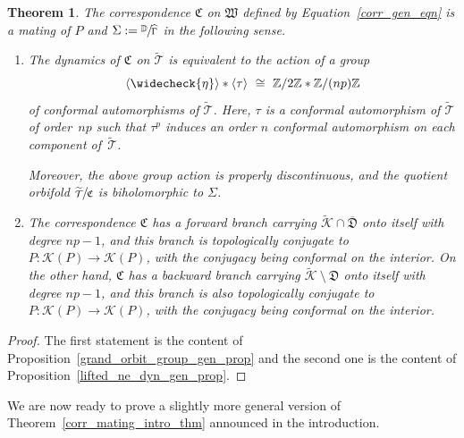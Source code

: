 \documentclass[JEP,XML,SOM,Unicode,NoFloatCountersInSection,published]{cedram}
\let\faktor\sfrac
\newtheorem{theorem}[lemma]{Theorem}
\theoremstyle{definition}
\theoremstyle{remark}
\newcommand{\D}{\mathbb{D}}
\newcommand{\Z}{\mathbb{Z}}
\newcommand{\cT}{\mathcal{T}}
\begin{document}
\begin{theorem}\label{corr_mating_thm_2}
The correspondence $\mathfrak{C}$ on $\mathfrak{W}$ defined by Equation~\eqref{corr_gen_eqn} is a mating of $P$ and $\Sigma:=\faktor{\D}{\widehat{\Gamma}}$ in the following sense.
\begin{enumerate}
\item The dynamics of $\mathfrak{C}$ on $\widetilde{\cT}$ is equivalent to the action of a group
\[
\langle\widecheck{\eta}\rangle\ast\langle\tau\rangle\ \cong\ \Z/2\Z\ast\Z/(np)\Z
\]
of conformal automorphisms of $\widetilde{\cT}$. Here, $\tau$ is a conformal automorphism of $\widetilde{\cT}$ of order~$np$ such that $\tau^p$ induces an order $n$ conformal automorphism on each component of~$\widetilde{\cT}$.

Moreover, the above group action is properly discontinuous, and the quotient orbifold $\faktor{\widetilde{\cT}}{\mathfrak{C}}$ is biholomorphic to $\Sigma$.

\item The correspondence $\mathfrak{C}$ has a forward branch carrying $\widetilde{\mathcal{K}}\cap\overline{\mathfrak{D}}$ onto itself with degree $np-1$, and this branch is topologically conjugate to $P:\mathcal{K}(P)\to \mathcal{K}(P)$, with the conjugacy being conformal on the interior. On the other hand, $\mathfrak{C}$ has a backward branch carrying $\widetilde{\mathcal{K}}\ \setminus\ \mathfrak{D}$ onto itself with degree $np-1$, and this branch is also topologically conjugate to $P:\mathcal{K}(P)\to \mathcal{K}(P)$, with the conjugacy being conformal on the interior.
\end{enumerate}
\end{theorem}

\begin{proof}
The first statement is the content of Proposition~\ref{grand_orbit_group_gen_prop} and the second one is the content of Proposition~\ref{lifted_ne_dyn_gen_prop}.
\end{proof}

We are now ready to prove a slightly more general version of Theorem~\ref{corr_mating_intro_thm} announced in the introduction.
\end{document}

